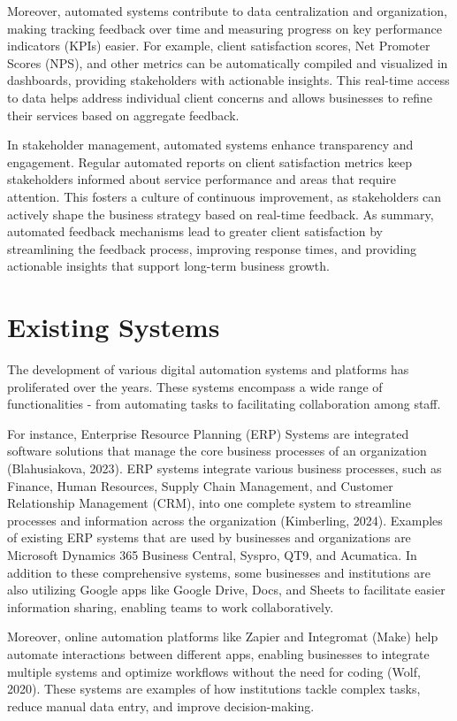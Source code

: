 Moreover, automated systems contribute to data centralization and organization, making tracking feedback over time and measuring progress on key performance indicators (KPIs) easier. For example, client satisfaction scores, Net Promoter Scores (NPS), and other metrics can be automatically compiled and visualized in dashboards, providing stakeholders with actionable insights. This real-time access to data helps address individual client concerns and allows businesses to refine their services based on aggregate feedback.

In stakeholder management, automated systems enhance transparency and engagement. Regular automated reports on client satisfaction metrics keep stakeholders informed about service performance and areas that require attention. This fosters a culture of continuous improvement, as stakeholders can actively shape the business strategy based on real-time feedback. As summary, automated feedback mechanisms lead to greater client satisfaction by streamlining the feedback process, improving response times, and providing actionable insights that support long-term business growth.

\section{Existing Systems}

The development of various digital automation systems and platforms has proliferated over the years. These systems encompass a wide range of functionalities - from automating tasks to facilitating collaboration among staff.

For instance, Enterprise Resource Planning (ERP) Systems are integrated software solutions that manage the core business processes of an organization (Blahusiakova, 2023). ERP systems integrate various business processes, such as Finance, Human Resources, Supply Chain Management, and Customer Relationship Management (CRM), into one complete system to streamline processes and information across the organization (Kimberling, 2024). Examples of existing ERP systems that are used by businesses and organizations are Microsoft Dynamics 365 Business Central, Syspro, QT9, and Acumatica. In addition to these comprehensive systems, some businesses and institutions are also utilizing Google apps like Google Drive, Docs, and Sheets to facilitate easier information sharing, enabling teams to work collaboratively. 
 
Moreover, online automation platforms like Zapier and Integromat (Make) help automate interactions between different apps, enabling businesses to integrate multiple systems and optimize workflows without the need for coding (Wolf, 2020). These systems are examples of how institutions tackle complex tasks, reduce manual data entry, and improve decision-making.

